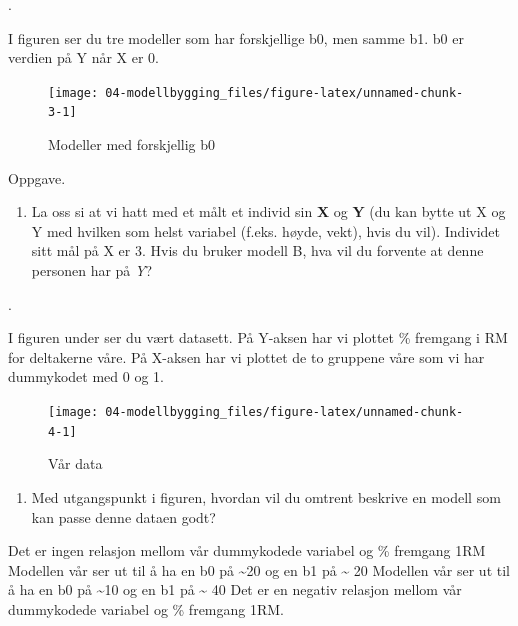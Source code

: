 \documentclass[
]{book}
\providecommand{\tightlist}{%
  \setlength{\itemsep}{0pt}\setlength{\parskip}{0pt}}
\begin{document}
.

I figuren ser du tre modeller som har forskjellige b0, men samme b1. b0 er verdien på Y når X er 0.

\begin{figure}

{\centering \texttt{[image: 04-modellbygging\_files/figure-latex/unnamed-chunk-3-1]} 

}

\caption{Modeller med forskjellig b0}\label{fig:unnamed-chunk-3}
\end{figure}

{Oppgave}.

\begin{enumerate}
\def\labelenumi{\alph{enumi}.}
\setcounter{enumi}{1}
\tightlist
\item
  La oss si at vi hatt med et målt et individ sin \textbf{X} og \textbf{Y} (du kan bytte ut X og Y med hvilken som helst variabel (f.eks. høyde, vekt), hvis du vil). Individet sitt mål på X er 3. Hvis du bruker modell B, hva vil du forvente at denne personen har på \emph{Y}?
\end{enumerate}

.

I figuren under ser du vært datasett. På Y-aksen har vi plottet \% fremgang i RM for deltakerne våre. På X-aksen har vi plottet de to gruppene våre som vi har dummykodet med 0 og 1.

\begin{figure}

{\centering \texttt{[image: 04-modellbygging\_files/figure-latex/unnamed-chunk-4-1]} 

}

\caption{Vår data}\label{fig:unnamed-chunk-4}
\end{figure}

\begin{enumerate}
\def\labelenumi{\alph{enumi}.}
\setcounter{enumi}{2}
\tightlist
\item
  Med utgangspunkt i figuren, hvordan vil du omtrent beskrive en modell som kan passe denne dataen godt?
\end{enumerate}

Det er ingen relasjon mellom vår dummykodede variabel og \% fremgang 1RM Modellen vår ser ut til å ha en b0 på \textasciitilde20 og en b1 på \textasciitilde{} 20 Modellen vår ser ut til å ha en b0 på \textasciitilde10 og en b1 på \textasciitilde{} 40 Det er en negativ relasjon mellom vår dummykodede variabel og \% fremgang 1RM.
\end{document}
